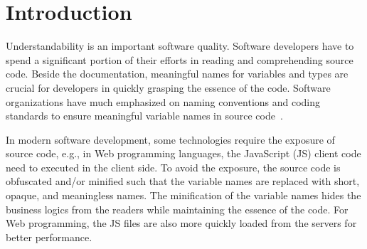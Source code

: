 \section{Introduction}
\label{intro:sec}

Understandability is an important software quality. Software
developers have to spend a significant portion of their efforts in
reading and comprehending source code. Beside the documentation,
meaningful names for variables and types are crucial for developers in
quickly grasping the essence of the code. Software organizations have
much emphasized on naming conventions and coding standards to ensure
meaningful variable names in source
code~\cite{barr-codeconvention-fse14}.



In modern software development, some technologies require the exposure
of source code, e.g., in Web programming languages, the JavaScript
(JS) client code need to executed in the client side. To avoid the
exposure, the source code is obfuscated and/or minified such that the
variable names are replaced with short, opaque, and meaningless names.
The minification of the variable names hides the business logics from
the readers while maintaining the essence of the code. For Web
programming, the JS files are also more quickly loaded from the
servers for better performance.


%
%

